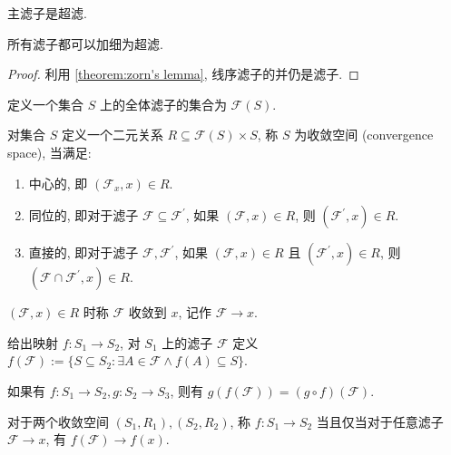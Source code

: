 \begin{corollary}
    主滤子是超滤.
\end{corollary}

\begin{lemma}
    所有滤子都可以加细为超滤.

    \begin{proof}
        利用 \ref{theorem:zorn's lemma}, 线序滤子的并仍是滤子.
    \end{proof}
\end{lemma}

\begin{definition}
    定义一个集合 \(S\) 上的全体滤子的集合为 \(\mathcal{F} (S)\).
\end{definition}

\begin{definition}[收敛空间]
    对集合 \(S\) 定义一个二元关系 \(R \subseteq \mathcal{F} (S) \times S\), 称 \(S\) 为收敛空间 (convergence space), 当满足:

    \begin{enumerate}
        \item 中心的, 即 \((\mathcal{F}_x,x) \in R\).
        \item 同位的, 即对于滤子 \(\mathcal{F} \subseteq \mathcal{F}^\prime\), 如果 \((\mathcal{F},x) \in R\), 则 \((\mathcal{F}^\prime,x) \in R\).
        \item 直接的, 即对于滤子 \(\mathcal{F}, \mathcal{F}^\prime\), 如果 \((\mathcal{F},x) \in R\) 且 \((\mathcal{F}^\prime,x) \in R\), 则 \((\mathcal{F} \cap \mathcal{F}^\prime,x) \in R\).
    \end{enumerate}

    \((\mathcal{F}, x) \in R\) 时称 \(\mathcal{F}\) 收敛到 \(x\), 记作 \(\mathcal{F} \to x\).
\end{definition}

\begin{definition}
    给出映射 \(f : S_1 \to S_2\), 对 \(S_1\) 上的滤子 \(\mathcal{F}\) 定义 \(f (\mathcal{F}) := \{S \subseteq S_2 : \exists A \in \mathcal{F} \land f(A) \subseteq S\}\).
\end{definition}

\begin{corollary}
    如果有 \(f : S_1 \to S_2, g : S_2 \to S_3\), 则有 \(g (f (\mathcal{F})) = (g \circ f) (\mathcal{F})\).
\end{corollary}

\begin{definition}[连续映射]
    对于两个收敛空间 \((S_1,R_1), (S_2,R_2)\), 称 \(f : S_1 \to S_2\) 当且仅当对于任意滤子 \(\mathcal{F} \to x\), 有 \(f (\mathcal{F}) \to f (x)\).
\end{definition}

